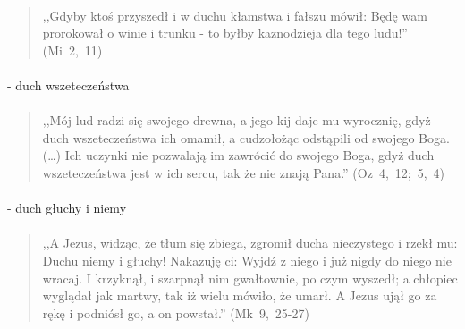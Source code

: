 \documentclass[10pt,a4paper,oneside]{article}
\begin{document}
\paragraph{}
\begin{quote}
,,Gdyby ktoś przyszedł i w duchu kłamstwa i fałszu mówił: Będę wam prorokował o winie i trunku - to byłby kaznodzieja dla tego ludu!'' \mbox{(Mi 2, 11)}
\end{quote}
\paragraph{}
- duch wszeteczeństwa
\paragraph{}
\begin{quote}
,,Mój lud radzi się swojego drewna, a jego kij daje mu wyrocznię, gdyż duch wszeteczeństwa ich omamił, a cudzołożąc odstąpili od swojego Boga. (\ldots) Ich uczynki nie pozwalają im zawrócić do swojego Boga, gdyż duch wszeteczeństwa jest w ich sercu, tak że nie znają Pana.'' \mbox{(Oz 4, 12; 5, 4)}
\end{quote}
\paragraph{}
- duch głuchy i niemy
\paragraph{}
\begin{quote}
,,A Jezus, widząc, że tłum się zbiega, zgromił ducha nieczystego i rzekł mu: Duchu niemy i głuchy! Nakazuję ci: Wyjdź z niego i już nigdy do niego nie wracaj. I krzyknął, i szarpnął nim gwałtownie, po czym wyszedł; a chłopiec wyglądał jak martwy, tak iż wielu mówiło, że umarł. A Jezus ujął go za rękę i podniósł go, a on powstał.'' \mbox{(Mk 9, 25-27)}
\end{quote}
\end{document}
